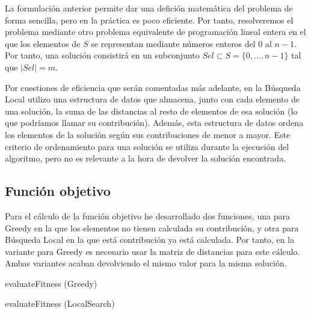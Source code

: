 \documentclass[10pt,a4paper]{article}
\begin{document}
La formulación anterior permite dar una defición matemática del problema de forma sencilla, pero en la práctica es poco eficiente. Por tanto, resolveremos el problema mediante otro problema equivalente de programación lineal entera en el que los elementos de $S$ se representan mediante números enteros del $0$ al $n-1$. Por tanto, una solución consistirá en un subconjunto $Sel \subset S = \{0,\dots,n-1\}$ tal que $|Sel| = m$.

Por cuestiones de eficiencia que serán comentadas más adelante, en la Búsqueda Local utilizo una estructura de datos que almacena, junto con cada elemento de una solución, la suma de las distancias al resto de elementos de esa solución (lo que podríamos llamar su contribución). Además, esta estructura de datos ordena los elementos de la solución según sus contribuciones de menor a mayor. Este criterio de ordenamiento para una solución se utiliza durante la ejecución del algoritmo, pero no es relevante a la hora de devolver la solución encontrada.

\subsection{Función objetivo}

Para el cálculo de la función objetivo he desarrollado dos funciones, una para Greedy en la que los elementos no tienen calculada su contribución, y otra para Búsqueda Local en la que está contribución ya está calculada. Por tanto, en la variante para Greedy es necesario usar la matriz de distancias para este cálculo. Ambas variantes acaban devolviendo el mismo valor para la misma solución.

\begin{algorithm}
	\caption{evaluateFitness (Greedy)}
\end{algorithm}

\begin{algorithm}
	\caption{evaluateFitness (LocalSearch)}
\end{algorithm}
\end{document}
